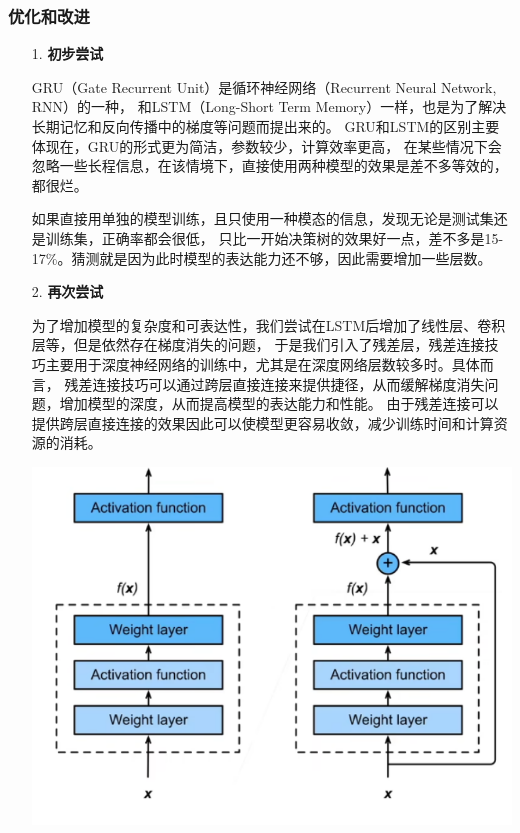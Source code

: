 \documentclass[11pt]{article}
\begin{document}
            \subsubsection{优化和改进}
            \begin{enumerate}
                \setlength{\parindent}{2em}
                \item [1. ]\textbf{初步尝试}\par
                GRU（Gate Recurrent Unit）是循环神经网络（Recurrent Neural Network, RNN）的一种，
                和LSTM（Long-Short Term Memory）一样，也是为了解决长期记忆和反向传播中的梯度等问题而提出来的。
                GRU和LSTM的区别主要体现在，GRU的形式更为简洁，参数较少，计算效率更高，
                在某些情况下会忽略一些长程信息，在该情境下，直接使用两种模型的效果是差不多等效的，都很烂。
                
                如果直接用单独的模型训练，且只使用一种模态的信息，发现无论是测试集还是训练集，正确率都会很低，
                只比一开始决策树的效果好一点，差不多是15-17\%。猜测就是因为此时模型的表达能力还不够，因此需要增加一些层数。
                
                \item [2. ]\textbf{再次尝试}\par
                为了增加模型的复杂度和可表达性，我们尝试在LSTM后增加了线性层、卷积层等，但是依然存在梯度消失的问题，
                于是我们引入了残差层，残差连接技巧主要用于深度神经网络的训练中，尤其是在深度网络层数较多时。具体而言，
                残差连接技巧可以通过跨层直接连接来提供捷径，从而缓解梯度消失问题，增加模型的深度，从而提高模型的表达能力和性能。
                由于残差连接可以提供跨层直接连接的效果因此可以使模型更容易收敛，减少训练时间和计算资源的消耗。
                \begin{center}
                    \includegraphics[scale = 1]{graph/lstm4.png}
                \end{center}


\end{enumerate}
\end{document}
